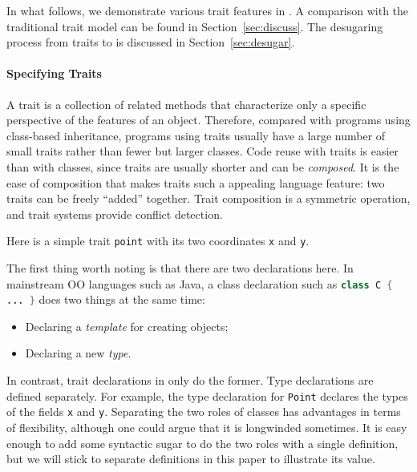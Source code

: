 In what follows, we demonstrate various trait features in \name. A
comparison with the traditional trait model can be found in
Section~\ref{sec:discuss}. The desugaring process from traits to
\bname is discussed in Section~\ref{sec:desugar}.

\paragraph{Specifying Traits}
A trait is a collection of related methods that characterize only
a specific perspective of the features of an object. Therefore, compared with
programs using class-based inheritance, programs using traits usually have a large number of
small traits rather than fewer but larger classes. Code reuse with traits is
easier than with classes, since traits are usually shorter and can be
\textit{composed}. It is the ease of composition that makes traits such a
appealing language feature: two traits can be freely ``added''
together. Trait composition is
a symmetric operation, and trait systems provide conflict detection.

Here is a simple trait \lstinline{point} with its two coordinates \lstinline{x}
and \lstinline{y}.


The first thing worth noting is that there are two declarations here.
In mainstream OO languages such as Java, a class
declaration such as \lstinline[language=java]$class C { ... }$ does two things
at the same time:

\begin{itemize}
\item Declaring a \textit{template} for creating objects;
\item Declaring a new \textit{type}.
\end{itemize}

In contrast, trait declarations in \name only do the former. Type
declarations are defined separately. For example, the type declaration 
for \lstinline{Point} declares the types of the fields \lstinline{x}
and \lstinline{y}. Separating the two roles of
classes has advantages in terms of flexibility, although one could
argue that it is longwinded sometimes. It is easy 
enough to add some syntactic sugar to do the two roles with a single 
definition, but we will stick to separate definitions in this paper 
to illustrate its value.

